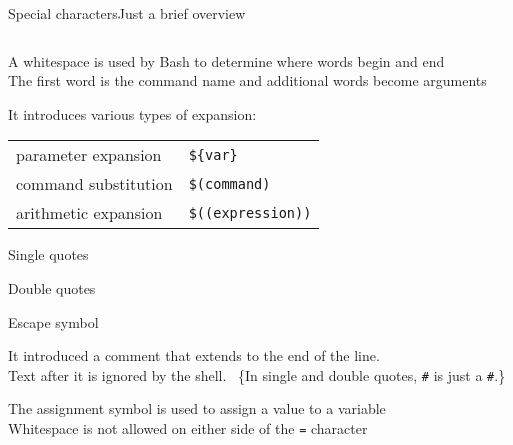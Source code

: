 \begin{frame}[fragile]{Special characters}{Just a brief overview}
    \vspace{-6mm}
    \begin{columns}
        \begin{column}{\dimexpr\paperwidth-10mm}
            \begin{description}[\texttt{>  >>  <}]
                \setlength{\itemsep}{1mm}
                \item<only@1>[\texttt{\textvisiblespace}]
                    A \alert{white}\alert{space} is used by Bash to determine where words begin and end \\
                    The first word is the command name and additional words become arguments
                \item<only@1>[\texttt{\$}]
                    It introduces various types of \alert{expansion}:
                    \begin{tabular}{ll}
                        \PB{$\bullet\;$} parameter expansion   & \texttt{\$\{var\}}          \\
                        \PB{$\bullet\;$} command substitution  & \texttt{\$(command)}      \\
                        \PB{$\bullet\;$} arithmetic expansion  & \texttt{\$((expression))} \\
                    \end{tabular}
                \item<only@1>[\texttt{' '}] \alert{Single quotes}
                \item<only@1>[\texttt{" "}] \alert{Double quotes}
                \item<only@1>[\texttt{\textbackslash}] \alert{Escape symbol}
                \item<only@1>[\texttt{\#}]
                    It introduced a \alert{comment} that extends to the end of the line. \\
                    Text after it is ignored by the shell. {~\tiny\{In single and double quotes, \texttt{\#} is just a \texttt{\#}.\}}
                \item<only@2>[\texttt{=}]
                    The \alert{assignment} symbol is used to assign a value to a variable \\
                    Whitespace is not allowed on either side of the \texttt{=} character
                \item<only@2>[\texttt{[[ ]]}]

\end{description}
\end{column}
\end{columns}
\end{frame}
